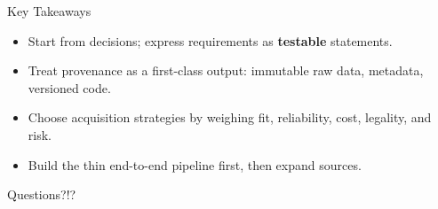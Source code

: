 \documentclass[aspectratio=43,11pt]{beamer}
\begin{document}
\begin{frame}{Key Takeaways}
  \begin{itemize}
    \item Start from decisions; express requirements as \textbf{testable} statements.
    \item Treat provenance as a first-class output: immutable raw data,
      metadata, versioned code.
    \item Choose acquisition strategies by weighing fit, reliability, cost,
      legality, and risk.
    \item Build the thin end-to-end pipeline first, then expand sources.
  \end{itemize}

  \bigskip
  \centering \Large Questions?!?
\end{frame}
\end{document}
